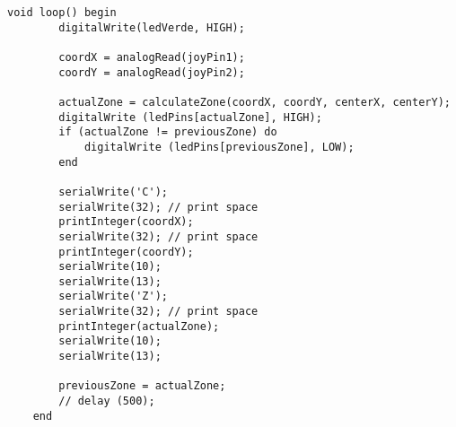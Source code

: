 \begin{lstlisting}[caption=Joystick code example based on the source language, label=lst:syntax2]
    void loop() begin
        digitalWrite(ledVerde, HIGH);           
                                                
        coordX = analogRead(joyPin1);   
        coordY = analogRead(joyPin2);   
                                                
        actualZone = calculateZone(coordX, coordY, centerX, centerY); 
        digitalWrite (ledPins[actualZone], HIGH);     
        if (actualZone != previousZone) do
            digitalWrite (ledPins[previousZone], LOW);
        end
                                                
        serialWrite('C');
        serialWrite(32); // print space
        printInteger(coordX);
        serialWrite(32); // print space
        printInteger(coordY);
        serialWrite(10);
        serialWrite(13);
        serialWrite('Z');
        serialWrite(32); // print space
        printInteger(actualZone);
        serialWrite(10);
        serialWrite(13);
                                                
        previousZone = actualZone;
        // delay (500);
    end
\end{lstlisting}
